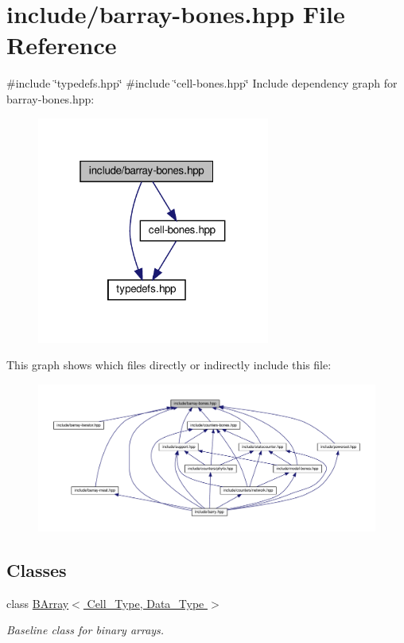 \hypertarget{barray-bones_8hpp}{}\section{include/barray-\/bones.hpp File Reference}
\label{barray-bones_8hpp}
{\ttfamily \#include \char`\"{}typedefs.\+hpp\char`\"{}}\newline
{\ttfamily \#include \char`\"{}cell-\/bones.\+hpp\char`\"{}}\newline
Include dependency graph for barray-\/bones.hpp\+:\nopagebreak
\begin{figure}[H]
\begin{center}
\leavevmode
\includegraphics[width=217pt]{barray-bones_8hpp__incl}
\end{center}
\end{figure}
This graph shows which files directly or indirectly include this file\+:
\nopagebreak
\begin{figure}[H]
\begin{center}
\leavevmode
\includegraphics[width=350pt]{barray-bones_8hpp__dep__incl}
\end{center}
\end{figure}
\subsection*{Classes}
\begin{DoxyCompactItemize}
\item 
class \hyperlink{class_b_array}{B\+Array$<$ Cell\+\_\+\+Type, Data\+\_\+\+Type $>$}
\begin{DoxyCompactList}\small\item\em Baseline class for binary arrays. \end{DoxyCompactList}\end{DoxyCompactItemize}
